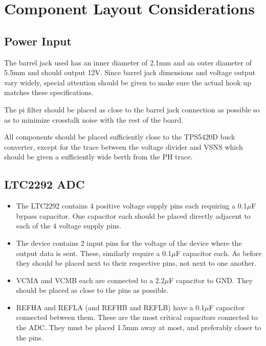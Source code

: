 \documentclass{default}
\begin{document}
\section{Component Layout Considerations}

\subsection{Power Input}
\label{sec:power-input-layout}

The barrel jack used has an inner diameter of 2.1mm and an outer diameter of 5.5mm and should output
12V. Since barrel jack dimensions and voltage output vary widely, special attention should be given
to make sure the actual hook up matches these specifications.

The pi filter should be placed as close to the barrel jack connection as possible so as to minimize
crosstalk noise with the rest of the board.

All components should be placed sufficiently close to the TPS5420D buck converter, except for the
trace between the voltage divider and VSNS which should be given a sufficiently wide berth from the
PH trace.

\subsection{LTC2292 ADC}

\begin{itemize}
\item The LTC2292 contains 4 positive voltage supply pins each requiring a 0.1$\mu$F bypass
        capacitor. One capacitor each should be placed directly adjacent to each of the 4 voltage
        supply pins.
\item The device contains 2 input pins for the voltage of the device where the output data is
        sent. These, similarly require a 0.1$\mu$F capacitor each. As before they should be placed
        next to their respective pins, not next to one another.
\item VCMA and VCMB each are connected to a 2.2$\mu$F capacitor to GND\@. They should be placed as
        close to the pins as possible.
\item REFHA and REFLA (and REFHB and REFLB) have a 0.1$\mu$F capacitor connected between them. These
        are the most critical capacitors connected to the ADC\@. They must be placed 1.5mm away at
        most, and preferably closer to the pins.
\end{itemize}
\end{document}
